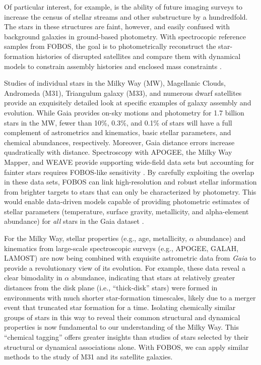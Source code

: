 \documentclass[11pt,a4paper,twoside,onecolumn,openany,final,oldfontcommands]{memoir}
\begin{document}
Of particular interest, for example, is the ability of future imaging surveys to increase the census of stellar streams and other substructure by a hundredfold.  The stars in these structures are faint, however, and easily confused with background galaxies in ground-based photometry.  With spectrocopic reference samples from FOBOS, the goal is to photometrically reconstruct the star-formation histories of disrupted satellites and compare them with dynamical models to constrain assembly histories and enclosed mass constraints \citep[e.g.,][]{2017ApJ...836..234S}.


Studies of individual stars in the Milky Way (MW), Magellanic Clouds, Andromeda (M31), Triangulum galaxy (M33), and numerous dwarf satellites provide an exquisitely detailed look at specific examples of galaxy assembly and evolution. While Gaia provides on-sky motions and photometry for 1.7 billion stars in the MW, fewer than 10\%, 0.3\%, and 0.1\% of stars will have a full complement of astrometrics and kinematics, basic stellar parameters, and chemical abundances, respectively.  Moreover, Gaia distance errors increase quadratically with distance.  Spectroscopy with APOGEE, the Milky Way Mapper, and WEAVE provide supporting wide-field data sets but accounting for fainter stars requires FOBOS-like sensitivity \citep[see][]{dey19,sanderson19}.  By carefully exploiting the overlap in these data sets, FOBOS can link high-resolution and robust stellar information from brighter targets to stars that can only be characterized by photometry.  This would enable data-driven models capable of providing photometric estimates of stellar parameters (temperature, surface gravity, metallicity, and alpha-element abundance) for \textit{ all} stars in the Gaia dataset  \citep[see][]{2015ApJ...808...16N, 2018arXiv180401530T, 2018arXiv180803278T}. 


For the Milky Way, stellar properties (e.g., age, metallicity, $\alpha$ abundance) and kinematics from large-scale spectroscopic surveys (e.g., APOGEE, GALAH, LAMOST) are now being combined with exquisite astrometric data from \textit{ Gaia} to provide a revolutionary view of its evolution.  For example, these data reveal a clear bimodality in $\alpha$ abundance, indicating that stars at relatively greater distances from the disk plane (i.e., ``thick-disk'' stars) were formed in environments with much shorter star-formation timescales, likely due to a merger event that truncated star formation for a time.  Isolating chemically similar groups of stars in this way to reveal their common structural and dynamical properties is now fundamental to our understanding of the Milky Way.  This ``chemical tagging'' offers greater insights than studies of stars selected by their structural or dynamical associations alone.  With FOBOS, we can apply similar methods to the study of M31 and its satellite galaxies.
\end{document}

